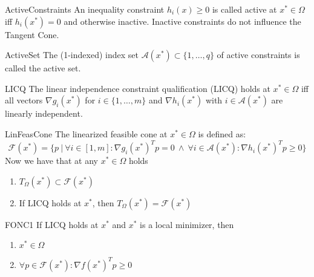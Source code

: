 \begin{theo}{ActiveConstraints}
    An inequality constraint $h_i(x) \geq 0$ is called active at $x^* \in \Omega$ iff $h_i(x^*) = 0$ and otherwise inactive. Inactive constraints do not influence the Tangent Cone.
\end{theo}

\begin{theo}{ActiveSet}
    The (1-indexed) index set $\mathcal{A}(x^*) \subset \{1,\ldots,q\}$ of active constraints is called the active set. 
\end{theo}

\begin{theo}{LICQ}
    The linear independence constraint qualification (LICQ) holds at $x^* \in \Omega$ iff all vectors $\nabla g_i(x^*)$ for $i \in \{1,\ldots, m\}$ and $\nabla h_i(x^*)$ with $i \in \mathcal{A}(x^*)$ are linearly independent.
\end{theo}

\begin{theo}{LinFeasCone}
    The linearized feasible cone at $x^* \in \Omega$ is defined as:
    \begin{equation*}
        \mathcal{F}(x^*) = \{p \ | \ \forall i \in [1,m]: \nabla g_i(x^*)^Tp = 0 \ \land \ \forall i \in \mathcal{A}(x^*): \nabla h_i(x^*)^Tp \geq 0\}
    \end{equation*}
    Now we have that at any $x^* \in \Omega$ holds 
    \begin{enumerate}
        \item $T_{\Omega}(x^*) \subset \mathcal{F}(x^*)$
        \item If LICQ holds at $x^*$, then $T_{\Omega}(x^*) = \mathcal{F}(x^*)$
    \end{enumerate}
    \vspace{-0.3cm}
\end{theo}

\begin{theo}{FONC1}
    If LICQ holds at $x^*$ and $x^*$ is a local minimizer, then
    \begin{enumerate}
        \item $x^* \in \Omega$
        \item $\forall p \in \mathcal{F}(x^*): \nabla f(x^*)^Tp \geq 0$
    \end{enumerate}
    \vspace{-0.3cm}
\end{theo}

